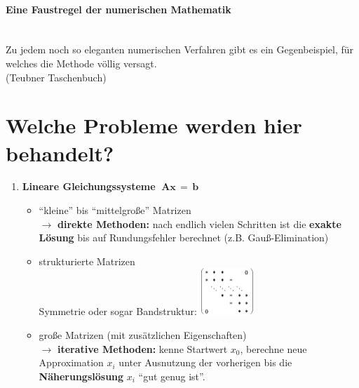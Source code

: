 \documentclass[ngerman,fontsize=11pt, paper=a4, parskip=half, titlepage=true, toc=bib]{scrbook}
\theoremstyle{definition}
\theoremstyle{plain}
\begin{document}
\paragraph{Eine Faustregel der numerischen Mathematik}~\\
Zu jedem noch so eleganten numerischen Verfahren gibt es ein Gegenbeispiel,
für welches die Methode völlig versagt. \\
{\tiny(Teubner Taschenbuch)}

\section*{Welche Probleme werden hier behandelt?}
\begin{enumerate}
\item \textbf{Lineare Gleichungssysteme} $\; \boldsymbol A \boldsymbol x \, = \, \boldsymbol b$ 
  \begin{itemize}
  \item \enquote{kleine} bis \enquote{mittelgroße} Matrizen\\
    $\rightarrow$ \textbf{direkte Methoden:} nach endlich vielen
    Schritten ist die \textbf{exakte Lösung} bis auf
    Rundungsfehler berechnet (z.B. Gauß-Elimination)
  \item strukturierte Matrizen \\
    Symmetrie oder sogar Bandstruktur: \hspace*{1cm}  
    \includegraphics[width=2cm]{images/band.jpg}
    
  \item große Matrizen (mit zusätzlichen Eigenschaften)\\
    $\rightarrow$ \textbf{iterative Methoden:} kenne Startwert
    $x_0$, berechne neue Approximation $x_i$ unter
    Ausnutzung der vorherigen bis die
    \textbf{Näherungslösung} $x_i$ \enquote{gut genug ist}.
  \end{itemize}
  

\end{enumerate}
\end{document}
